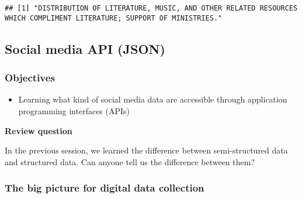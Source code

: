 \documentclass[
]{book}
\providecommand{\tightlist}{%
  \setlength{\itemsep}{0pt}\setlength{\parskip}{0pt}}
\begin{document}
\begin{verbatim}
## [1] "DISTRIBUTION OF LITERATURE, MUSIC, AND OTHER RELATED RESOURCES WHICH COMPLIMENT LITERATURE; SUPPORT OF MINISTRIES."
\end{verbatim}

\hypertarget{social-media-api-json}{%
\subsection{Social media API (JSON)}\label{social-media-api-json}}

\hypertarget{objectives-4}{%
\subsubsection{Objectives}\label{objectives-4}}

\begin{itemize}
\tightlist
\item
  Learning what kind of social media data are accessible through application programming interfaces (APIs)
\end{itemize}

\textbf{Review question}

In the previous session, we learned the difference between semi-structured data and structured data. Can anyone tell us the difference between them?

\hypertarget{the-big-picture-for-digital-data-collection}{%
\subsubsection{The big picture for digital data collection}\label{the-big-picture-for-digital-data-collection}}
\end{document}

